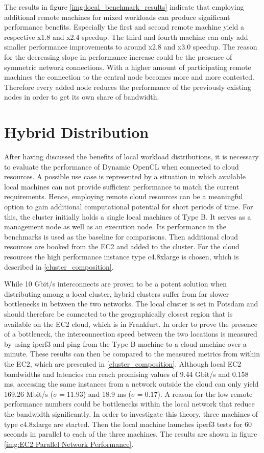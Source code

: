 The results in figure \ref{img:local_benchmark_results} indicate that employing additional remote machines for mixed workloads can produce significant performance benefits. Especially the first and second remote machine yield a respective x1.8 and x2.4 speedup. The third and fourth machine can only add smaller performance improvements to around x2.8 and x3.0 speedup. The reason for the decreasing slope in performance increase could be the presence of symmetric network connections. With a higher amount of participating remote machines the connection to the central node becomes more and more contested. Therefore every added node reduces the performance of the previously existing nodes in order to get its own share of bandwidth.


\section{Hybrid Distribution}

After having discussed the benefits of local workload distributions, it is necessary to evaluate the performance of Dynamic OpenCL when connected to cloud resources. A possible use case is represented by a situation in which available local machines can not provide sufficient performance to match the current requirements. Hence, employing remote cloud resources can be a meaningful option to gain additional computational potential for short periods of time. For this, the cluster initially holds a single local machines of Type B. It serves as a management node as well as an execution node. Its performance in the benchmarks is used as the baseline for comparisons. Then additional cloud resources are booked from the EC2 and added to the cluster. For the cloud resources the high performance instance type c4.8xlarge is chosen, which is described in \ref{cluster_composition}.

While 10 Gbit/s interconnects are proven to be a potent solution when distributing among a local cluster, hybrid clusters suffer from far slower bottlenecks in between the two networks. The local cluster is set in Potsdam and should therefore be connected to the geographically closest region that is available on the EC2 cloud, which is in Frankfurt. In order to prove the presence of a bottleneck, the interconnection speed between the two locations is measured by using iperf3 and ping from the Type B machine to a cloud machine over a minute. These results can then be compared to the measured metrics from within the EC2, which are presented in \ref{cluster_composition}. Although local EC2 bandwidths and latencies can reach promising values of 9.44 Gbit/s and 0.158 ms, accessing the same instances from a network outside the cloud can only yield 169.26 Mbit/s ($\sigma = 11.93$) and 18.9 ms ($\sigma = 0.17$). A reason for the low remote performance numbers could be bottlenecks within the local network that reduce the bandwidth significantly. In order to investigate this theory, three machines of type c4.8xlarge are started. Then the local machine launches iperf3 tests for 60 seconds in parallel to each of the three machines. The results are shown in figure \ref{img:EC2 Parallel Network Performance}.

